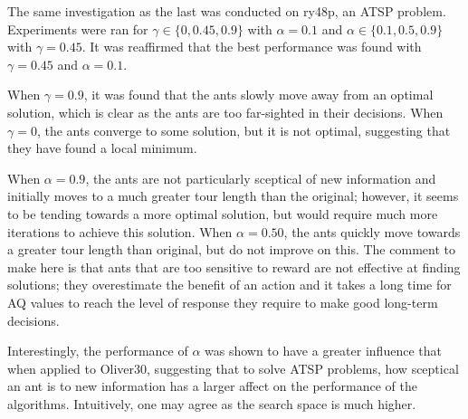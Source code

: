 The same investigation as the last was conducted on ry48p, an ATSP problem. Experiments were ran for $\gamma \in \{0, 0.45, 0.9\}$ with $\alpha = 0.1$ and $\alpha \in \{0.1, 0.5, 0.9\}$ with $\gamma = 0.45$. It was reaffirmed that the best performance was found with $\gamma = 0.45$ and $\alpha = 0.1$. 

When $\gamma = 0.9$, it was found that the ants slowly move away from an optimal solution, which is clear as the ants are too far-sighted in their decisions. When $\gamma = 0$, the ants converge to some solution, but it is not optimal, suggesting that they have found a local minimum. 

When $\alpha = 0.9$, the ants are not particularly sceptical of new information and initially moves to a much greater tour length than the original; however, it seems to be tending towards a more optimal solution, but would require much more iterations to achieve this solution. When $\alpha = 0.50$, the ants quickly move towards a greater tour length than original, but do not improve on this. The comment to make here is that ants that are too sensitive to reward are not effective at finding solutions; they overestimate the benefit of an action and it takes a long time for AQ values to reach the level of response they require to make good long-term decisions.

Interestingly, the performance of $\alpha$ was shown to have a greater influence that when applied to Oliver30, suggesting that to solve ATSP problems, how sceptical an ant is to new information has a larger affect on the performance of the algorithms. Intuitively, one may agree as the search space is much higher. 